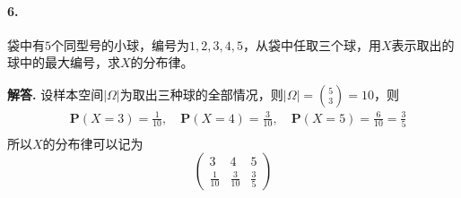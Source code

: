 \documentclass[12pt, a4paper, oneside]{ctexart}
\newenvironment{solution}{\par\noindent\textbf{解答. }}{\bigskip\par}
\begin{document}
\paragraph{6.}袋中有$5$个同型号的小球，编号为$1,2,3,4,5$，从袋中任取三个球，用$X$表示取出的球中的最大编号，求$X$的分布律。
\begin{solution}
    设样本空间$|\Omega|$为取出三种球的全部情况，则$|\Omega|  = \binom{5}{3}=10$，则
    \begin{equation*}
        \begin{aligned}
            &\textbf{P}(X = 3) = \frac{1}{10},\quad\textbf{P}(X = 4) = \frac{3}{10},\quad\textbf{P}(X = 5) = \frac{6}{10}=\frac{3}{5}\\
        \end{aligned}
    \end{equation*}
    所以$X$的分布律可以记为
    \begin{equation*}
        \left(\begin{matrix}
            3&4&5\\
            \frac{1}{10}&\frac{3}{10}&\frac{3}{5}
        \end{matrix}\right)
    \end{equation*}
\end{solution}
\end{document}
